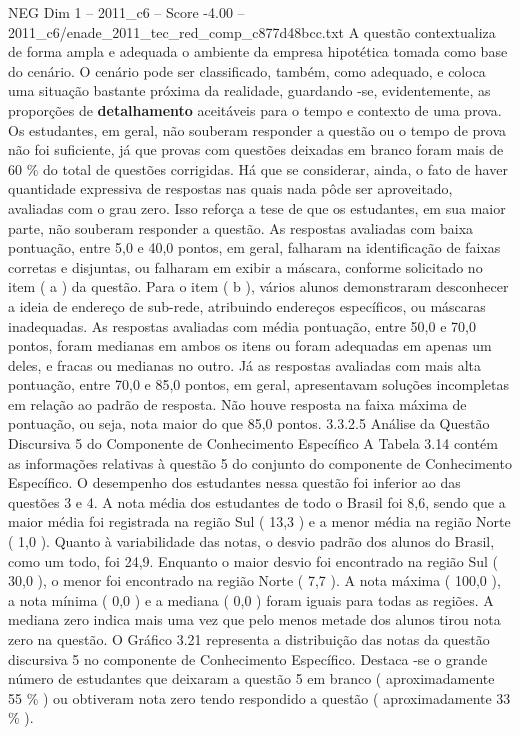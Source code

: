 \begin{textsample}{NEG Dim 1 – 2011\_c6 – Score -4.00 – 2011\_c6/enade\_2011\_tec\_red\_comp\_c877d48bcc.txt}
A questão contextualiza de forma ampla e adequada o ambiente da empresa hipotética tomada como base do cenário.
O cenário pode ser classificado, também, como adequado, e coloca uma situação bastante próxima da realidade, guardando -se, evidentemente, as proporções de \textbf{detalhamento} aceitáveis para o tempo e contexto de uma prova.
Os estudantes, em geral, não souberam responder a questão ou o tempo de prova não foi suficiente, já que provas com questões deixadas em branco foram mais de 60 \% do total de questões corrigidas.
Há que se considerar, ainda, o fato de haver quantidade expressiva de respostas nas quais nada pôde ser aproveitado, avaliadas com o grau zero.
Isso reforça a tese de que os estudantes, em sua maior parte, não souberam responder a questão.
As respostas avaliadas com baixa pontuação, entre 5,0 e 40,0 pontos, em geral, falharam na identificação de faixas corretas e disjuntas, ou falharam em exibir a máscara, conforme solicitado no item ( a ) da questão.
Para o item ( b ), vários alunos demonstraram desconhecer a ideia de endereço de sub-rede, atribuindo endereços específicos, ou máscaras inadequadas.
As respostas avaliadas com média pontuação, entre 50,0 e 70,0 pontos, foram medianas em ambos os itens ou foram adequadas em apenas um deles, e fracas ou medianas no outro.
Já as respostas avaliadas com mais alta pontuação, entre 70,0 e 85,0 pontos, em geral, apresentavam soluções incompletas em relação ao padrão de resposta.
Não houve resposta na faixa máxima de pontuação, ou seja, nota maior do que 85,0 pontos. 3.3.2.5 Análise da Questão Discursiva 5 do Componente de Conhecimento Específico A Tabela 3.14 contém as informações relativas à questão 5 do conjunto do componente de Conhecimento Específico.
O desempenho dos estudantes nessa questão foi inferior ao das questões 3 e 4.
A nota média dos estudantes de todo o Brasil foi 8,6, sendo que a maior média foi registrada na região Sul ( 13,3 ) e a menor média na região Norte ( 1,0 ).
Quanto à variabilidade das notas, o desvio padrão dos alunos do Brasil, como um todo, foi 24,9.
Enquanto o maior desvio foi encontrado na região Sul ( 30,0 ), o menor foi encontrado na região Norte ( 7,7 ).
A nota máxima ( 100,0 ), a nota mínima ( 0,0 ) e a mediana ( 0,0 ) foram iguais para todas as regiões.
A mediana zero indica mais uma vez que pelo menos metade dos alunos tirou nota zero na questão.
O Gráfico 3.21 representa a distribuição das notas da questão discursiva 5 no componente de Conhecimento Específico.
Destaca -se o grande número de estudantes que deixaram a questão 5 em branco ( aproximadamente 55 \% ) ou obtiveram nota zero tendo respondido a questão ( aproximadamente 33 \% ).

\end{textsample}

